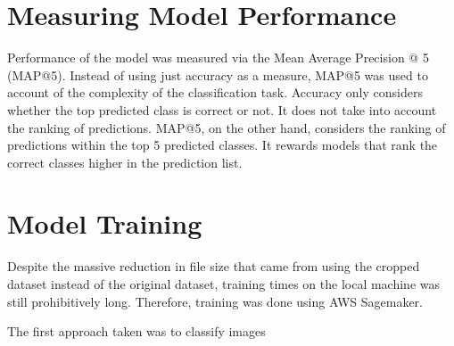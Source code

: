 \documentclass{article}
\begin{document}
\section{Measuring Model Performance}

Performance of the model was measured via the Mean Average Precision @ 5 (MAP@5). Instead of using just accuracy as a measure, MAP@5 was used to account of the complexity of the
classification task. Accuracy only considers whether the top predicted class is correct or not. It does not take into account the ranking of predictions. MAP@5, on the other hand, considers the ranking of predictions within the top 5 predicted classes. It rewards models that rank the correct classes higher in the prediction list.




\section{Model Training}

Despite the massive reduction in file size that came from using the cropped dataset instead of the original dataset, training times on the local machine was still prohibitively long. Therefore, training was done using AWS Sagemaker.

The first approach taken was to classify images
\end{document}
